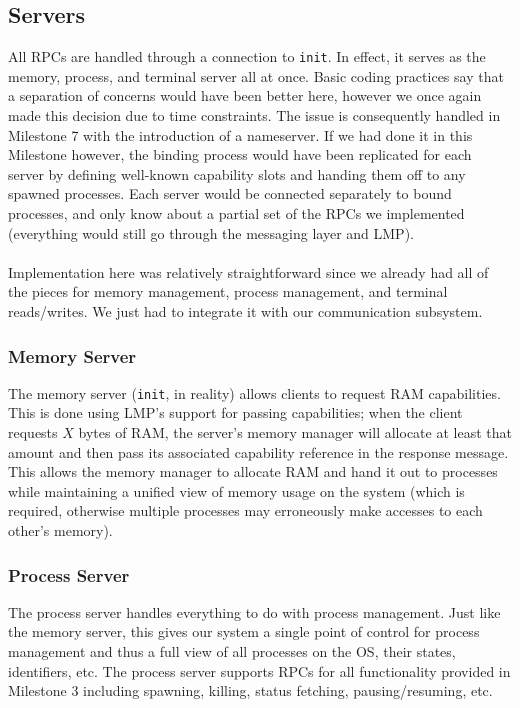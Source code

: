 \subsection{Servers}
All RPCs are handled through a connection to \texttt{init}. In effect, it serves as the memory, process, and terminal server all at once. Basic coding practices say that a separation of concerns would have been better here, however we once again made this decision due to time constraints. The issue is consequently handled in Milestone 7 with the introduction of a nameserver. If we had done it in this Milestone however, the binding process would have been replicated for each server by defining well-known capability slots and handing them off to any spawned processes. Each server would be connected separately to bound processes, and only know about a partial set of the RPCs we implemented (everything would still go through the messaging layer and LMP).
\\\\
Implementation here was relatively straightforward since we already had all of the pieces for memory management, process management, and terminal reads/writes. We just had to integrate it with our communication subsystem.

\subsubsection{Memory Server}
The memory server (\texttt{init}, in reality) allows clients to request RAM capabilities. This is done using LMP's support for passing capabilities; when the client requests $X$ bytes of RAM, the server's memory manager will allocate at least that amount and then pass its associated capability reference in the response message. This allows the memory manager to allocate RAM and hand it out to processes while maintaining a unified view of memory usage on the system (which is required, otherwise multiple processes may erroneously make accesses to each other's memory).

\subsubsection{Process Server}
The process server handles everything to do with process management. Just like the memory server, this gives our system a single point of control for process management and thus a full view of all processes on the OS, their states, identifiers, etc. The process server supports RPCs for all functionality provided in Milestone 3 including spawning, killing, status fetching, pausing/resuming, etc. 

